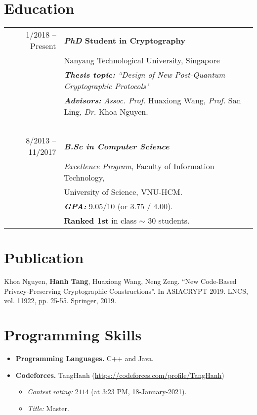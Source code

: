 \documentclass[a4paper, 11pt]{article}
\begin{document}
	\section{Education}
	\begin{tabular}{rl}	
		1/2018 -- Present & \textbf{\textit{PhD} Student in Cryptography} \\
		& Nanyang Technological University, Singapore   \\
		\ & \textbf{\textit{Thesis topic:}} \textit{``Design of New Post-Quantum Cryptographic Protocols"}\\
		
		\ & \textbf{\textit{Advisors:}} \textit{Assoc. Prof.} Huaxiong Wang, \textit{Prof.} San Ling, \textit{Dr.} Khoa Nguyen.\\
		\ & \ \\
		8/2013 -- 11/2017 & \textbf{\textit{B.Sc in Computer Science}} \\ 
		& \textit{Excellence Program}, Faculty of Information Technology,\\ &University of Science, VNU-HCM.\\
		\ & \textbf{\textit{GPA:}} 9.05/10 (or 3.75 / 4.00).\\
		\ & \textbf{Ranked 1st} in class $\sim$ 30 students.
	\end{tabular}
	
	\section{Publication}
	Khoa Nguyen, \textbf{Hanh Tang}, Huaxiong Wang, Neng Zeng. ``New Code-Based Privacy-Preserving Cryptographic Constructions''. In ASIACRYPT 2019. LNCS, vol. 11922, pp. 25-55. Springer, 2019.
	
	\section{Programming Skills}
	\begin{itemize}[noitemsep]
		\item \textbf{Programming Languages.} C++ and Java.
		\item \textbf{Codeforces.} TangHanh (\url{https://codeforces.com/profile/TangHanh})
		\begin{itemize}
			\item \textit{Contest rating:} $2114$ (at 3:23 PM, 18-January-2021).
			\item \textit{Title:} Master.
		\end{itemize}
	\end{itemize}
	
\end{document}
